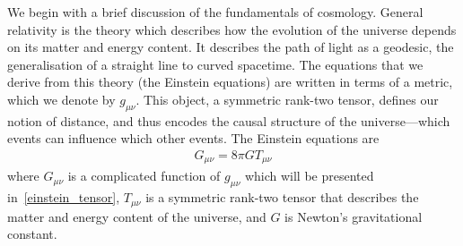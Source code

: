     We begin with a brief discussion of the fundamentals of cosmology.
    General relativity is the theory which describes how the evolution of the universe depends
    on its matter and energy content. It describes the path of light as a geodesic,
    the generalisation of a straight line to curved spacetime.
    The equations that we derive from this theory (the Einstein equations) are written in terms of a metric,
    which we denote by $g_{\mu\nu}$. This object, a symmetric rank-two tensor,
    defines our notion of distance, and thus encodes
    the causal structure of the universe---which events can influence which other events.
    The Einstein equations are
    \begin{align}\label{einstein_equations}
        G_{\mu\nu} = 8\pi G T_{\mu\nu}
    \end{align}
    where $G_{\mu\nu}$ is a complicated function of $g_{\mu\nu}$ which
    will be presented in~\eqref{einstein_tensor},
    $T_{\mu\nu}$ is a symmetric rank-two tensor that describes the matter
    and energy content of the universe,
    and $G$ is Newton's gravitational constant.
    

